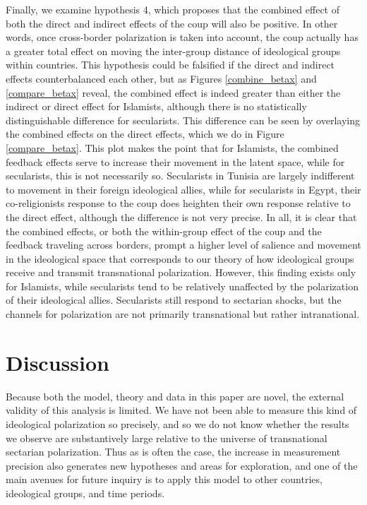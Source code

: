 \documentclass[12pt]{article}
\begin{document}
Finally, we examine hypothesis 4, which proposes that the combined effect of both the direct and indirect effects of the coup will also be positive. In other words, once cross-border polarization is taken into account, the coup actually has a greater total effect on moving the inter-group distance of ideological groups within countries. This hypothesis could be falsified if the direct and indirect effects counterbalanced each other, but as Figures \ref{combine_betax} and \ref{compare_betax} reveal, the combined effect is indeed greater than either the indirect or direct effect for Islamists, although there is no statistically distinguishable difference for secularists. This difference can be seen by overlaying the combined effects on the direct effects, which we do in Figure \ref{compare_betax}. This plot makes the point that for Islamists, the combined feedback effects serve to increase their movement in the latent space, while for secularists, this is not necessarily so. Secularists in Tunisia are largely indifferent to movement in their foreign ideological allies, while for secularists in Egypt, their co-religionists response to the coup does heighten their own response relative to the direct effect, although the difference is not very precise. In all, it is clear that the combined effects, or both the within-group effect of the coup and the feedback traveling across borders, prompt a higher level of salience and movement in the ideological space that corresponds to our theory of how ideological groups receive and transmit transnational polarization. However, this finding exists only for Islamists, while secularists tend to be relatively unaffected by the polarization of their ideological allies. Secularists still respond to sectarian shocks, but the channels for polarization are not primarily transnational but rather intranational.


\section*{Discussion}

Because both the model, theory and data in this paper are novel, the external validity of this analysis is limited. We have not been able to measure this kind of ideological polarization so precisely, and so we do not know whether the results we observe are substantively large relative to the universe of transnational sectarian polarization. Thus as is often the case, the increase in measurement precision also generates new hypotheses and areas for exploration, and one of the main avenues for future inquiry is to apply this model to other countries, ideological groups, and time periods. 
\end{document}
